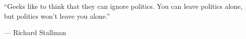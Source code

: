 \null
\vfill
\epigraph{``Geeks like to think that they can ignore politics. You can leave
politics alone, but politics won't leave you alone.''}{--- Richard Stallman}
